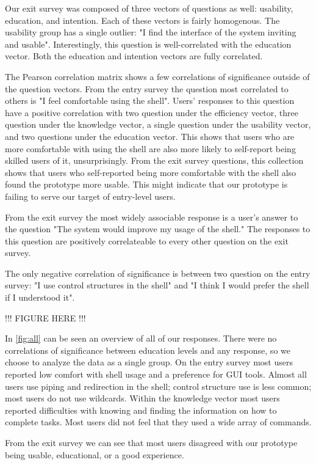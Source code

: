 Our exit survey was composed of three vectors of questions as well: usability,
education, and intention. Each of these vectors is fairly homogenous. The
usability group has a single outlier: "I find the interface of the system
inviting and usable". Interestingly, this question is well-correlated with the
education vector. Both the education and intention vectors are fully correlated.

The Pearson correlation matrix shows a few correlations of significance outside
of the question vectors.  From the entry survey the question most correlated to
others is "I feel comfortable using the shell". Users' responses to this question
have a positive correlation with two question under the efficiency vector, three
question under the knowledge vector, a single question under the usability
vector, and two questions under the education vector. This shows that users who
are more comfortable with using the shell are also more likely to self-report
being skilled users of it, unsurprisingly. From the exit survey questions, this
collection shows that users who self-reported being more comfortable with the
shell also found the prototype more usable. This might indicate that our
prototype is failing to serve our target of entry-level users.

From the exit survey the most widely associable response is a user's answer to
the question "The system would improve my usage of the shell." The responses to
this question are positively correlateable to every other question on the exit
survey.

The only negative correlation of significance is between two question on the
entry survey: "I use control structures in the shell" and "I think I would
prefer the shell if I understood it".

!!! FIGURE HERE !!!

In \ref{fig:all} can be seen an overview of all of our responses. There were no
correlations of significance between education levels and any response, so we
choose to analyze the data as a single group. On the entry survey most users
reported low comfort with shell usage and a preference for GUI tools. Almost all
users use piping and redirection in the shell; control structure use is less
common; most users do not use wildcards. Within the knowledge vector most users
reported difficulties with knowing and finding the information on how to
complete tasks. Most users did not feel that they used a wide array of commands.

From the exit survey we can see that most users disagreed with our prototype
being usable, educational, or a good experience.

